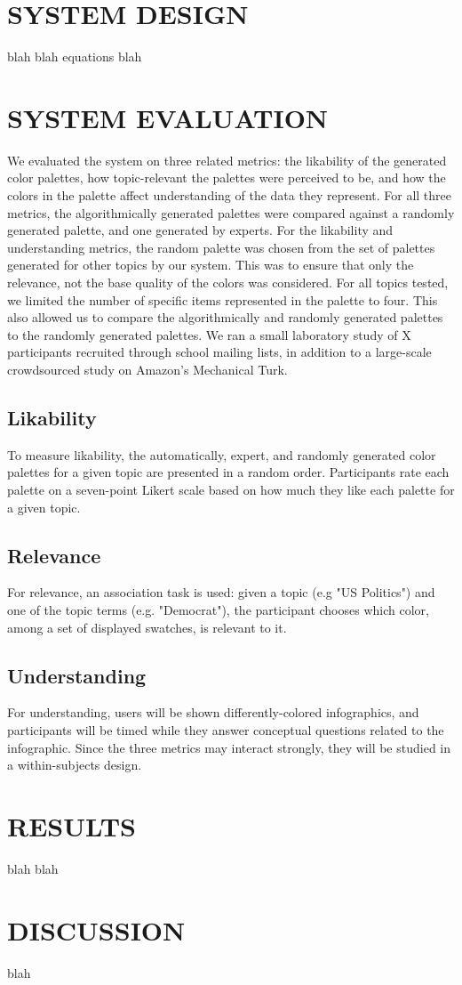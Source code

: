 \documentclass{article}
\begin{document}
\section{SYSTEM DESIGN}
blah blah equations blah

\section{SYSTEM EVALUATION}
We evaluated the system on three related metrics: the likability of the generated color palettes, how topic-relevant the palettes were perceived to be, and how the colors in the palette affect understanding of the data they represent. For all three metrics, the algorithmically generated palettes were compared against a randomly generated palette, and one generated by experts. For the likability and understanding metrics, the random palette was chosen from the set of palettes generated for other topics by our system. This was to ensure that only the relevance, not the base quality of the colors was considered. For all topics tested, we limited the number of specific items represented in the palette to four. This also allowed us to compare the algorithmically and randomly generated palettes to the randomly generated palettes. We ran a small laboratory study of X participants recruited through school mailing lists, in addition to a large-scale crowdsourced study on Amazon's Mechanical Turk. 

\subsection{Likability}
To measure likability, the automatically, expert, and randomly generated color palettes for a given topic are presented in a random order. Participants rate each palette on a seven-point Likert scale based on how much they like each palette for a given topic. 

\subsection{Relevance}
For relevance, an association task is used: given a topic (e.g "US Politics") and one of the topic terms (e.g. "Democrat"), the participant chooses which color, among a set of displayed swatches, is relevant to it.

\subsection{Understanding}
For understanding, users will be shown differently-colored infographics, and participants will be timed while they answer conceptual questions related to the infographic. Since the three metrics may interact strongly, they will be studied in a within-subjects design.

\section{RESULTS}
blah blah

\section{DISCUSSION}
blah






\end{document}

